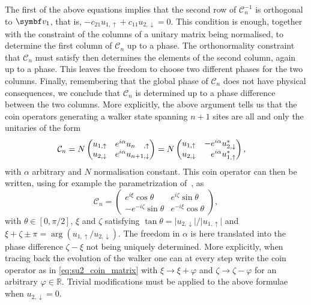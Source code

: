 The first of the above equations implies that the second row of $\mathcal C_n^{-1}$ is orthogonal to $\bs v_1$, that is,
$
	- c_{21} u_{1, \uparrow} + c_{11} u_{2, \downarrow} = 0.
$
This condition is enough, together with the constraint of the columns of a unitary matrix being normalised, to determine the first column of $\mathcal C_n$ up to a phase.
The orthonormality constraint that $\mathcal C_n$ must satisfy then determines the elements of the second column, again up to a phase.
This leaves the freedom to choose two different phases for the two columns.
Finally, remembering that the global phase of $\mathcal C_n$ does not have physical consequences, we conclude that $\mathcal C_n$ is determined up to a phase difference between the two columns.
More explicitly, the above argument tells us that the coin operators generating a walker state spanning $n+1$ sites are all and only the unitaries of the form
\begin{equation*}
\begin{aligned}
	\mathcal C_n
	&= N \begin{pmatrix}
		u_{1,\uparrow} & e^{i\alpha} u_{\makebox[0pt][l]{$\scriptstyle n$}\phantom{n+1},\uparrow} \\
		u_{2,\downarrow} & e^{i\alpha} u_{n+1,\downarrow}
	\end{pmatrix} = N \begin{pmatrix}
		u_{1,\uparrow} & -e^{i\alpha} u_{2,\downarrow}^* \\
		u_{2,\downarrow} & \phantom{-}e^{i\alpha} u_{1,\uparrow}^*
	\end{pmatrix},
\end{aligned}
\end{equation*}
with $\alpha$ arbitrary and $N$ normalisation constant.
This coin operator can then be written, using for example the parametrization of~\cite{chandrashekar2008optimizing}, as
\begin{equation}
	\mathcal C_n = 
	\begin{pmatrix}
		e^{i\xi} \cos\theta &
		e^{i\zeta} \sin\theta \\
		-e^{-i\zeta}\sin\theta & e^{-i\xi}\cos\theta
	\end{pmatrix},
	\label{eq:su2_coin_matrix}
\end{equation}
with $\theta\in [0, \pi/2]$, $\xi$ and $\zeta$ satisfying
$\tan\theta = \lvert u_{2,\downarrow} \rvert/\lvert u_{1,\uparrow} \rvert$
and
$\xi + \zeta \pm \pi = \arg\left(u_{1, \uparrow}/u_{2, \downarrow}\right)$.
The freedom in $\alpha$ is here translated into the phase difference $\zeta - \xi$ not being uniquely determined.
More explicitly, when tracing back the evolution of the walker one can at every step write the coin operator as in \cref{eq:su2_coin_matrix} with $\xi \to \xi + \varphi$ and $\zeta \to \zeta - \varphi$ for an arbitrary $\varphi\in \mathbb R$.
Trivial modifications must be applied to the above formulae when $u_{2,\downarrow} = 0$.

